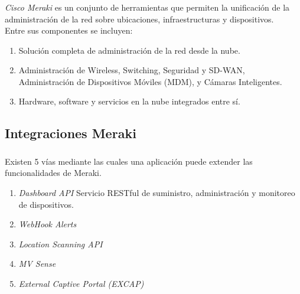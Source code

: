 \begin{frame}
\frametitle{\currentname}
\emph{Cisco Meraki} es un conjunto de herramientas que permiten la unificación de la administración de la red sobre ubicaciones, infraestructuras y dispositivos. \\ 
Entre sus componentes se incluyen:
\begin{enumerate}
\item Solución completa de administración de la red desde la nube.
\item Administración de Wireless, Switching, Seguridad y SD-WAN, Administración de Dispositivos Móviles (MDM), y Cámaras Inteligentes.
\item Hardware, software y servicios en la nube integrados entre sí.
\end{enumerate}
\end{frame}

\subsection{Integraciones Meraki}
\begin{frame}
\frametitle{\currentname}
Existen 5 vías mediante las cuales una aplicación puede extender las funcionalidades de Meraki.
\begin{enumerate}
\item \emph{Dashboard API} Servicio RESTful de suministro, administración y monitoreo de dispositivos.
\item \emph{WebHook Alerts}
\item \emph{Location Scanning API}
\item \emph{MV Sense}
\item \emph{External Captive Portal (EXCAP)}
\end{enumerate}
\end{frame}
